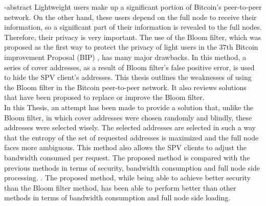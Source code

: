 
\en-abstract{
Lightweight users make up a significant portion of Bitcoin's peer-to-peer network. On the other hand, these users depend on the full node to receive their information, so a significant part of their information is revealed to the full nodes. Therefore, their privacy is very important. The use of the Bloom filter, which was proposed as the first way to protect the privacy of light users in the $37$th Bitcoin improvement Proposal (BIP) , has many major drawbacks. In this method, a series of cover addresses, as a result of Bloom filter's false positive error, is used to hide the SPV client's addresses. This thesis outlines the weaknesses of using the Bloom filter in the Bitcoin peer-to-peer network. It also reviews solutions that have been proposed to replace or improve the Bloom filter.\\
In this Thesis, an attempt has been made to provide a solution that, unlike the Bloom filter, in which cover addresses were chosen randomly and blindly, these addresses were selected wisely.  The selected addresses are selected in such a way that the entropy of the set of requested addresses is maximized and the full node faces more ambiguous. This method also allows the SPV clients to adjust the bandwidth consumed per request. The proposed method is compared with the previous methods in terms of security, bandwidth consumption and full node side processing. . The proposed method, while being able to achieve better security than the Bloom filter method, has been able to perform better than other methods in terms of bandwidth consumption and full node side loading.
}
